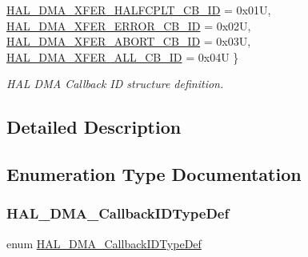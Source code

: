 \begin{DoxyCompactItemize}
\hyperlink{group___d_m_a___exported___types_ggafbe8b2bd9ce2128de6cdc08ccde7e8ada4b1606f39a4eec41d958bc878719f046}{H\+A\+L\+\_\+\+D\+M\+A\+\_\+\+X\+F\+E\+R\+\_\+\+H\+A\+L\+F\+C\+P\+L\+T\+\_\+\+C\+B\+\_\+\+ID} = 0x01U, 
\hyperlink{group___d_m_a___exported___types_ggafbe8b2bd9ce2128de6cdc08ccde7e8ada3e76bc89154e0b50333cc551bf0337a6}{H\+A\+L\+\_\+\+D\+M\+A\+\_\+\+X\+F\+E\+R\+\_\+\+E\+R\+R\+O\+R\+\_\+\+C\+B\+\_\+\+ID} = 0x02U, 
\hyperlink{group___d_m_a___exported___types_ggafbe8b2bd9ce2128de6cdc08ccde7e8ada3059a9412e0624699e9123ba2bccdf3e}{H\+A\+L\+\_\+\+D\+M\+A\+\_\+\+X\+F\+E\+R\+\_\+\+A\+B\+O\+R\+T\+\_\+\+C\+B\+\_\+\+ID} = 0x03U, 
\newline
\hyperlink{group___d_m_a___exported___types_ggafbe8b2bd9ce2128de6cdc08ccde7e8adac9935fd906719942d6b09cfd55e837f0}{H\+A\+L\+\_\+\+D\+M\+A\+\_\+\+X\+F\+E\+R\+\_\+\+A\+L\+L\+\_\+\+C\+B\+\_\+\+ID} = 0x04U
 \}\begin{DoxyCompactList}\small\item\em H\+AL D\+MA Callback ID structure definition. \end{DoxyCompactList}
\end{DoxyCompactItemize}


\subsection{Detailed Description}


\subsection{Enumeration Type Documentation}
\mbox{\label{group___d_m_a___exported___types_gafbe8b2bd9ce2128de6cdc08ccde7e8ad}} 
\subsubsection{\texorpdfstring{H\+A\+L\+\_\+\+D\+M\+A\+\_\+\+Callback\+I\+D\+Type\+Def}{HAL\_DMA\_CallbackIDTypeDef}}
{\footnotesize\ttfamily enum \hyperlink{group___d_m_a___exported___types_gafbe8b2bd9ce2128de6cdc08ccde7e8ad}{H\+A\+L\+\_\+\+D\+M\+A\+\_\+\+Callback\+I\+D\+Type\+Def}}



